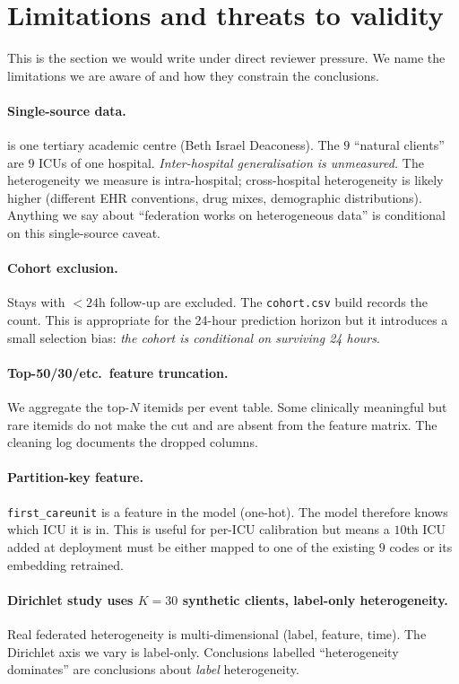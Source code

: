 \section{Limitations and threats to validity}
\label{sec:limits}

This is the section we would write under direct reviewer pressure. We name
the limitations we are aware of and how they constrain the conclusions.

\paragraph{Single-source data.} \mimic{} is one tertiary academic centre
(Beth Israel Deaconess). The $9$ ``natural clients'' are $9$ ICUs of one
hospital. \emph{Inter-hospital generalisation is unmeasured.} The
heterogeneity we measure is intra-hospital; cross-hospital heterogeneity
is likely higher (different EHR conventions, drug mixes, demographic
distributions). Anything we say about ``federation works on heterogeneous
data'' is conditional on this single-source caveat.

\paragraph{Cohort exclusion.} Stays with $< 24$h follow-up are excluded. The
\texttt{cohort.csv} build records the count. This is appropriate for the
24-hour prediction horizon but it introduces a small selection bias:
\emph{the cohort is conditional on surviving 24 hours}.

\paragraph{Top-50/30/etc.\ feature truncation.} We aggregate the top-$N$
itemids per event table. Some clinically meaningful but rare itemids do not
make the cut and are absent from the feature matrix. The cleaning log
documents the dropped columns.

\paragraph{Partition-key feature.} \texttt{first\_careunit} is a feature in
the model (one-hot). The model therefore knows which ICU it is in. This is
useful for per-ICU calibration but means a $10$th ICU added at deployment
must be either mapped to one of the existing $9$ codes or its embedding
retrained.

\paragraph{Dirichlet study uses $K\!=\!30$ synthetic clients, label-only
heterogeneity.} Real federated heterogeneity is multi-dimensional (label,
feature, time). The Dirichlet axis we vary is label-only. Conclusions
labelled ``heterogeneity dominates'' are conclusions about \emph{label}
heterogeneity.

